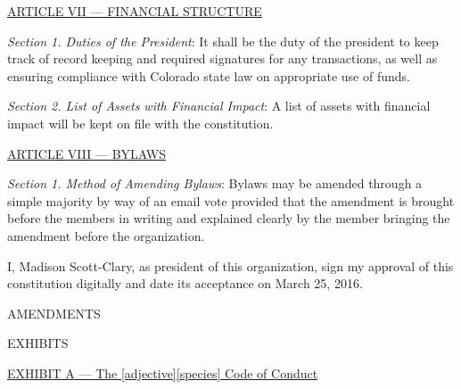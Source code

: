 \documentclass{article}
\begin{document}
\bigskip

\large{\underline{ARTICLE VII --- FINANCIAL STRUCTURE}}

\emph{Section 1. Duties of the President}: It shall be the duty of the president to keep track of record keeping and required signatures for any transactions, as well as ensuring compliance with Colorado state law on appropriate use of funds.

\emph{Section 2. List of Assets with Financial Impact}: A list of assets with financial impact will be kept on file with the constitution.

\bigskip

\large{\underline{ARTICLE VIII --- BYLAWS}}

\emph{Section 1. Method of Amending Bylaws}: Bylaws may be amended through a simple majority by way of an email vote provided that the amendment is brought before the members in writing and explained clearly by the member bringing the amendment before the organization.

\bigskip

I, Madison Scott-Clary, as president of this organization, sign my approval of this constitution digitally and date its acceptance on March 25, 2016.

\bigskip

\newpage

\begin{center}
\Huge{AMENDMENTS}
\end{center}

\newpage

\begin{center}
\Huge{EXHIBITS}
\end{center}

\large{\underline{EXHIBIT A --- The [adjective][species] Code of Conduct}}

\smallskip


\end{document}

